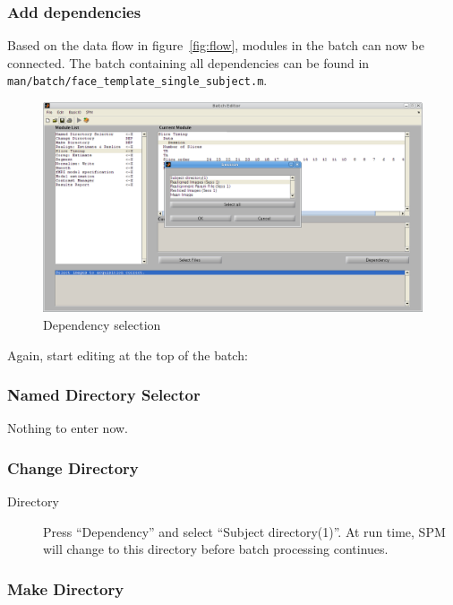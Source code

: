 \documentclass[a4paper]{book}
\begin{document}
\subsubsection{Add dependencies}

Based on the data flow in figure~\ref{fig:flow}, modules in the batch can now
be connected. The batch containing all dependencies can be found in
\verb|man/batch/face_template_single_subject.m|.

\begin{figure}[htbp]
  \centering
  \includegraphics[width=\textwidth]{batch_dependencies}
  \caption{Dependency selection}
  \label{fig:batch_dependency}
\end{figure}

Again, start editing at the top of the batch:

\subsubsection*{Named Directory Selector}

Nothing to enter now.

\subsubsection*{Change Directory}

\begin{description}
\item[Directory] Press ``Dependency'' and select ``Subject
  directory(1)''. At run time, SPM will change to this directory before batch
  processing continues.
\end{description}

\subsubsection*{Make Directory}
\end{document}
